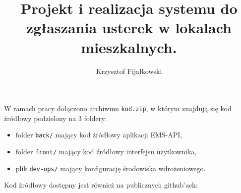 \documentclass[
    left=2.5cm,         %
    right=2.5cm,        %
    top=2.5cm,          %
    bottom=3cm,         %
    bindingoffset=6mm,  %
    nohyphenation=false %
]{eiti/eiti-thesis}
\begin{document}
\EngineerThesis %
{}
\title{
    Projekt i realizacja systemu do zgłaszania usterek w lokalach mieszkalnych.
}
\author{Krzysztof Fijałkowski}
\date{\the\year}
\maketitle



\cleardoublepage %
\tableofcontents

\cleardoublepage %
\pagestyle{headings}










                            

\cleardoublepage %
\printbibliography

\newpage
\pagestyle{plain}


\listoffigurestoc     %
\vspace{1cm}          %
\listoftablestoc      %
\vspace{1cm}          %
\listofappendicestoc
W ramach pracy dołączono archiwum \texttt{kod.zip}, w którym znajdują się kod źródłowy podzielony na 3 foldery:
\begin{itemize}
   \item folder \texttt{back/} mający kod źródłowy aplikacji EMS-API,
   \item folder \texttt{front/} mający kod źródłowy interfejsu użytkownika,
   \item plik \texttt{dev-ops/} mający konfigurację środowiska wdrożeniowego.
\end{itemize}
Kod źródłowy dostępny jest również na publicznych github'ach:
\end{document}
